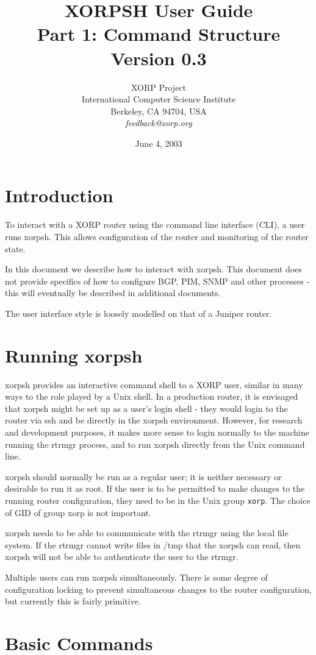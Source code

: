 \documentclass[11pt]{article}
\title{XORPSH User Guide\\
Part 1: Command Structure\\
\vspace{1ex}
Version 0.3}
\author{ XORP Project					\\
	 International Computer Science Institute	\\
	 Berkeley, CA 94704, USA			\\
	 {\it feedback@xorp.org}
}
\date{June 4, 2003}
\newcommand{\xorpsh}{{\sf\small xorpsh}\xspace}
\begin{document}
\maketitle                            
\section{Introduction}
To interact with a XORP router using the command line interface (CLI),
a user runs \xorpsh.  This allows configuration of the router and
monitoring of the router state.  

In this document we describe how to interact with \xorpsh.  This
document does not provide specifics of how to configure BGP, PIM, SNMP
and other processes - this will eventually be described in additional
documents.

The user interface style is loosely modelled on that of a Juniper
router.

\section{Running xorpsh}
\xorpsh provides an interactive command shell to a XORP user, similar
in many ways to the role played by a Unix shell.  In a production
router, it is envisaged that \xorpsh might be set up as a user's login
shell - they would login to the router via ssh and be directly in the
\xorpsh environment.  However, for research and development purposes,
it makes more sense to login normally to the machine running the
rtrmgr process, and to run \xorpsh directly from the Unix command line.

\xorpsh should normally be run as a regular user; it is neither
necessary or desirable to run it as root.  If the user is to be
permitted to make changes to the running router configuration, they
need to be in the Unix group {\tt xorp}.  The choice of GID of group
xorp is not important.

\xorpsh needs to be able to communicate with the rtrmgr using the local
file system.  If the rtrmgr cannot write files in /tmp that the \xorpsh
can read, then \xorpsh will not be able to authenticate the user to the
rtrmgr.

Multiple users can run \xorpsh simultaneously.  There is some degree of
configuration locking to prevent simultaneous changes to the router
configuration, but currently this is fairly primitive.

\section{Basic Commands}
\end{document}
